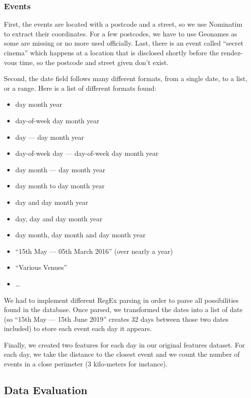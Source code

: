 \subsubsection{Events}

First, the events are located with a postcode and a street, so we use Nominatim to extract
their coordinates. For a few postcodes, we have to use Geonames as some are missing
or no more used officially. Last, there is an event called ``secret cinema'' which
happens at a location that is disclosed shortly before the rendez-vous time, so
the postcode and street given don't exist.

Second, the date field follows many different formats, from a single date, to a list,
or a range. Here is a list of different formats found:
\begin{itemize}
    \item day month year
    \item day-of-week day month year
    \item day --- day month year
    \item day-of-week day --- day-of-week day month year
    \item day month --- day month year
    \item day month to day month year
    \item day and day month year
    \item day, day and day month year
    \item day month, day month and day month year
    \item ``15th May --- 05th March 2016'' (over nearly a year)
    \item ``Various Venues''
    \item \ldots{}
\end{itemize}

We had to implement different RegEx parsing in order to parse all possibilities
found in the database.
Once parsed, we transformed the dates into a list of date
(so ``15th May --- 15th June 2019'' creates 32 days between those two dates included)
to store each event each day it appears.

Finally, we created two features for each day in our original features dataset.
For each day, we take the distance to the closest event and we count the number
of events in a close perimeter (3 kilo-meters for instance).

\subsection{Data Evaluation}

